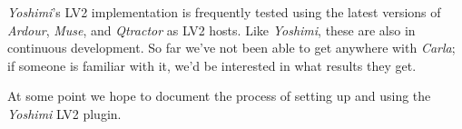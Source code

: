 %

   \textsl{Yoshimi}'s LV2 implementation is frequently tested using the latest
   versions of \textsl{Ardour}, \textsl{Muse}, and \textsl{Qtractor} as LV2
   hosts. Like \textsl{Yoshimi}, these are also in continuous development. So
   far we've not been able to get anywhere with \textsl{Carla}; if someone is
   familiar with it, we'd be interested in what results they get.

   At some point we hope to document the process of setting up and using
   the \textsl{Yoshimi} LV2 plugin.



